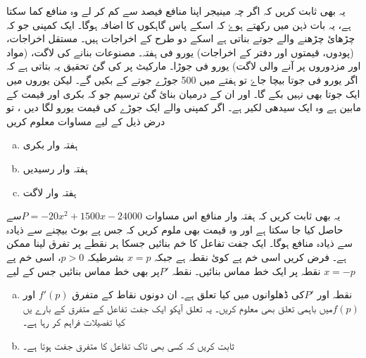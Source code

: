 یہ بھی ثابت کریں کہ اگر چہ مینیجر اپنا منافع  فیصد سے کم کر لے وہ منافع کما سکتا ہے، یہ بات ذہن میں رکھتے ہوۓ کہ اسکے پاس گاہکوں کا اضافہ ہوگا۔
ایک کمپنی جو کہ چڑھائ چڑھنے والے جوتے بناتی ہے اسکے دو طرح کے اخراجات ہیں۔
مستقل اخراجات، (پودوں، قیمتوں اور دفتر کے اخراجات)  یورو فی ہفتہ۔
مصنوعات بنانے کی لاگت، (مواد اور مزدوروں پر آنے والی لاگت) یورو فی جوڑا۔
مارکیٹ پر کی گئ تحقیق یہ بتاتی ہے کہ اگر  یورو فی جوتا بیچا جاۓ تو ہفتے میں 500 جوڑے جوتے کے بکیں گے۔ لیکن      یوروں میں ایک جوتا بھی نہیں بکے گا۔ اور ان کے درمیان بنائ گئ ترسیم جو کہ بکری اور قیمت کے مابین ہے وہ ایک سیدھی لکیر ہے۔
اگر کمپنی والے ایک جوڑے کی قیمت  یورو لگا دیں ، تو درض ذیل کے لیے مساوات معلوم کریں
\begin{enumerate}[a.]
\item  ہفتہ وار بکری
\item  ہفتہ وار رسیدیں 
\item  ہفتہ وار لاگت
\end{enumerate}

یہ بھی ثابت کریں کہ ہفتہ وار منافع اس مساوات \( P=-20x^2+1500x-24000 \)سے حاصل کیا جا سکتا ہے اور وہ قیمت بھی ملوم کریں کہ جس پے بوٹ بیچنے سے ذیادہ سے ذیادہ منافع ہوگا۔
ایک جفت تفاعل کا خم بنائیں جسکا ہر نقطے پر تفرق لینا ممکن ہے۔
فرض کریں اسی خم پے   کوئ نقطہ ہے جبکہ $ x=p $ بشرطیکہ  $p>0 $، اسی خم پے نقطہ   پر ایک خط مماس بنائیں۔ نقطہ  \(P\prime\)پر بھی خط مماس بنائیں جس کے لیے  $x=-p$ 

\begin{enumerate}[a.]
\item  
نقطہ    اور  \(P\prime\)کی ڈھلوانوں میں کیا تعلق ہے۔ ان دونوں نقاط کے متفرق    $f'(p)$    اور   $f(p)$میں باہمی تعلق بھی معلوم کریں۔ یہ تعلق آپکو ایک جفت تفاعل کے متفرق کے بارے یں کیا تفصیلات فراہم کر رہا ہے۔
\item 
ثابت کریں کہ کسی بھی تاک تفاعل کا متفرق جفت ہوتا ہے۔
\end{enumerate}
